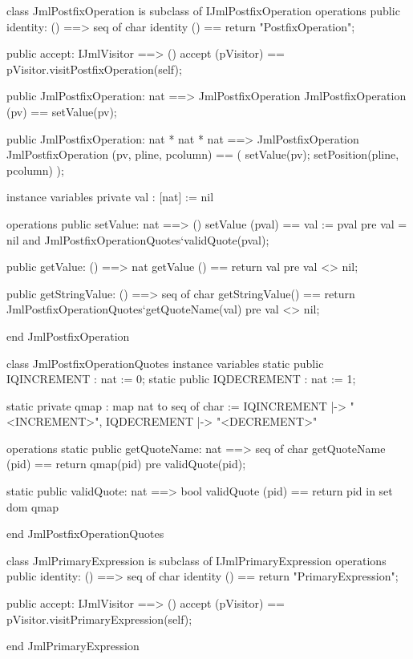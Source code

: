 \begin{vdm_al}
class JmlPostfixOperation is subclass of IJmlPostfixOperation
operations
  public identity: () ==> seq of char
  identity () == return "PostfixOperation";

  public accept: IJmlVisitor ==> ()
  accept (pVisitor) == pVisitor.visitPostfixOperation(self);

  public JmlPostfixOperation: nat ==> JmlPostfixOperation
  JmlPostfixOperation (pv) == setValue(pv);

  public JmlPostfixOperation: nat * nat * nat ==> JmlPostfixOperation
  JmlPostfixOperation (pv, pline, pcolumn) == ( setValue(pv); setPosition(pline, pcolumn) );

instance variables
  private val : [nat] := nil

operations
  public setValue: nat ==> ()
  setValue (pval) == val := pval
    pre val = nil and JmlPostfixOperationQuotes`validQuote(pval);

  public getValue: () ==> nat
  getValue () == return val
    pre val <> nil;

  public getStringValue: () ==> seq of char
  getStringValue() == return JmlPostfixOperationQuotes`getQuoteName(val)
    pre val <> nil;

end JmlPostfixOperation
\end{vdm_al}
\begin{vdm_al}
class JmlPostfixOperationQuotes
instance variables
  static public IQINCREMENT : nat := 0;
  static public IQDECREMENT : nat := 1;

  static private qmap : map nat to seq of char :=
    { IQINCREMENT |-> "<INCREMENT>",
      IQDECREMENT |-> "<DECREMENT>" }

operations
  static public getQuoteName: nat ==> seq of char
  getQuoteName (pid) ==
    return qmap(pid)
    pre validQuote(pid);

  static public validQuote: nat ==> bool
  validQuote (pid) == return pid in set dom qmap

end JmlPostfixOperationQuotes
\end{vdm_al}
\begin{vdm_al}
class JmlPrimaryExpression is subclass of IJmlPrimaryExpression
operations
  public identity: () ==> seq of char
  identity () == return "PrimaryExpression";

  public accept: IJmlVisitor ==> ()
  accept (pVisitor) == pVisitor.visitPrimaryExpression(self);

end JmlPrimaryExpression
\end{vdm_al}
